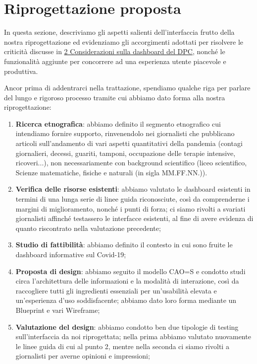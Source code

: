 \documentclass[../../main.tex]{subfiles}
\begin{document}
\section{Riprogettazione proposta}
In questa sezione, descriviamo gli aspetti salienti dell'interfaccia frutto della nostra riprogettazione ed evidenziamo gli accorgimenti adottati per risolvere le criticità discusse in \hyperref[s:considerazioni]{2 Considerazioni sulla dashboard del DPC}, nonché le funzionalità aggiunte per concorrere ad una esperienza utente piacevole e produttiva.

Ancor prima di addentrarci nella trattazione, spendiamo qualche riga per parlare del lungo e  rigoroso processo tramite cui abbiamo dato forma alla nostra riprogettazione:
\begin{enumerate}
    \item \textbf{Ricerca etnografica}: abbiamo definito il segmento etnografico cui intendiamo fornire supporto, rinvenendolo nei giornalisti che pubblicano articoli sull'andamento di vari aspetti quantitativi della pandemia (contagi giornalieri, decessi, guariti, tamponi, occupazione delle terapie intensive, ricoveri...), non necessariamente con background scientifico (liceo scientifico, Scienze matematiche, fisiche e naturali (in sigla MM.FF.NN.)).
    \item \textbf{Verifica delle risorse esistenti}: abbiamo valutato le dashboard esistenti in termini di una lunga serie di linee guida riconosciute, così da comprenderne i margini di miglioramento, nonché i punti di forza; ci siamo rivolti a svariati giornalisti affinché testassero le interfacce esistenti, al fine di avere evidenza di quanto riscontrato nella valutazione precedente;
    \item \textbf{Studio di fattibilità}: abbiamo definito il contesto in cui sono fruite le dashboard informative sul Covid-19;
    \item \textbf{Proposta di design}: abbiamo seguito il modello CAO=S e condotto studi circa l'architettura delle informazioni e la modalità di interazione, così da raccogliere tutti gli ingredienti essenziali per un'usabilità elevata e un'esperienza d'uso soddisfacente; abbiamo dato  loro forma mediante un Blueprint e vari Wireframe;
    \item \textbf{Valutazione del design}: abbiamo condotto ben due tipologie di testing sull'interfaccia da noi riprogettata; nella prima abbiamo valutato nuovamente le linee guida di cui al punto 2, mentre nella seconda ci siamo rivolti a giornalisti per averne opinioni e impressioni;
\end{enumerate}
\end{document}
